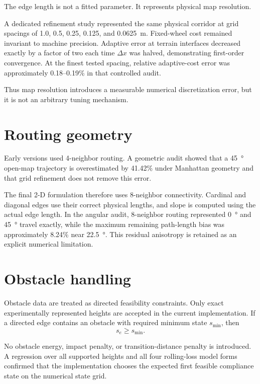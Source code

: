 \documentclass[11pt]{article}
\begin{document}
The edge length is not a fitted parameter. It represents physical map resolution.

A dedicated refinement study represented the same physical corridor at grid spacings of 1.0, 0.5, 0.25, 0.125, and \SI{0.0625}{m}. Fixed-wheel cost remained invariant to machine precision. Adaptive error at terrain interfaces decreased exactly by a factor of two each time $\Delta x$ was halved, demonstrating first-order convergence. At the finest tested spacing, relative adaptive-cost error was approximately 0.18--0.19\% in that controlled audit.

Thus map resolution introduces a measurable numerical discretization error, but it is not an arbitrary tuning mechanism.

\section{Routing geometry}

Early versions used 4-neighbor routing. A geometric audit showed that a \SI{45}{\degree} open-map trajectory is overestimated by 41.42\% under Manhattan geometry and that grid refinement does not remove this error.

The final 2-D formulation therefore uses 8-neighbor connectivity. Cardinal and diagonal edges use their correct physical lengths, and slope is computed using the actual edge length. In the angular audit, 8-neighbor routing represented \SI{0}{\degree} and \SI{45}{\degree} travel exactly, while the maximum remaining path-length bias was approximately 8.24\% near \SI{22.5}{\degree}. This residual anisotropy is retained as an explicit numerical limitation.

\section{Obstacle handling}

Obstacle data are treated as directed feasibility constraints. Only exact experimentally represented heights are accepted in the current implementation. If a directed edge contains an obstacle with required minimum state $s_{\min}$, then
\begin{equation}
s_e\ge s_{\min}.
\end{equation}

No obstacle energy, impact penalty, or transition-distance penalty is introduced. A regression over all supported heights and all four rolling-loss model forms confirmed that the implementation chooses the expected first feasible compliance state on the numerical state grid.
\end{document}
